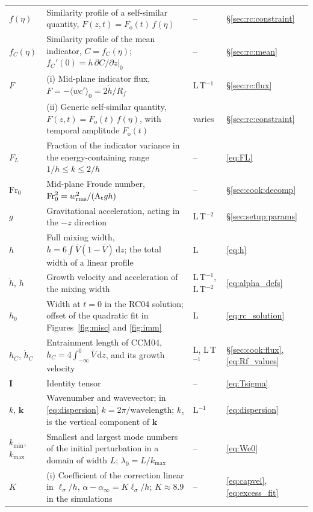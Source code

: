 \documentclass[11pt]{article}
\numberwithin{equation}{section}
\newcommand{\avg}[1]{\langle #1\rangle}
\newcommand{\At}{\mathrm{A_t}}
\newcommand{\ls}{\ell_\sigma}
\newcommand{\hd}{\dot h}
\begin{document}
\begin{longtable}{@{}P{0.13}P{0.53}P{0.13}P{0.13}@{}}
$f(\eta)$ & Similarity profile of a self-similar quantity, $F(z, t) = F_\mathrm{o}(t) \, f(\eta)$ & -- & \S\ref{sec:rc:constraint}\\
$f_C(\eta)$ & Similarity profile of the mean indicator, $C = f_C(\eta)$; $f_C'(0) = h \, \partial C/\partial z |_0$ & -- & \S\ref{sec:rc:mean}\\
$F$ & (i) Mid-plane indicator flux, $F = -\avg{w c'}_0 = 2 \hd/R_f$ & L\,T$^{-1}$ & \S\ref{sec:rc:flux}\\
 & (ii) Generic self-similar quantity, $F(z, t) = F_\mathrm{o}(t) \, f(\eta)$, with temporal amplitude $F_\mathrm{o}(t)$ & varies & \S\ref{sec:rc:constraint}\\
$F_L$ & Fraction of the indicator variance in the energy-containing range $1/h \le k \le 2/h$ & -- & \eqref{eq:FL}\\
$\mathrm{Fr}_0$ & Mid-plane Froude number, $\mathrm{Fr}_0^2 = w_{\rm rms}^2/(\At g h)$ & -- & \S\ref{sec:cook:decomp}\\
$g$ & Gravitational acceleration, acting in the $-z$ direction & L\,T$^{-2}$ & \S\ref{sec:setup:params}\\
$h$ & Full mixing width, $h = 6 \int \bar V(1 - \bar V) \, \mathrm d z$; the total width of a linear profile & L & \eqref{eq:h}\\
$\hd$, $\ddot h$ & Growth velocity and acceleration of the mixing width & L\,T$^{-1}$, L\,T$^{-2}$ & \eqref{eq:alpha_defs}\\
$h_0$ & Width at $t = 0$ in the RC04 solution; offset of the quadratic fit in Figures~\ref{fig:misc} and \ref{fig:imm} & L & \eqref{eq:rc_solution}\\
$h_C$, $\hd_C$ & Entrainment length of CCM04, $h_C = 4 \int_{-\infty}^0 \bar V \, \mathrm d z$, and its growth velocity & L, L\,T$^{-1}$ & \S\ref{sec:cook:flux}, \eqref{eq:Rf_values}\\
$\mathbf I$ & Identity tensor & -- & \eqref{eq:Tsigma}\\
$k$, $\mathbf k$ & Wavenumber and wavevector; in \eqref{eq:dispersion} $k = 2 \pi/\text{wavelength}$; $k_z$ is the vertical component of $\mathbf k$ & L$^{-1}$ & \eqref{eq:dispersion}\\
$k_{\min}$, $k_{\max}$ & Smallest and largest mode numbers of the initial perturbation in a domain of width $L$; $\lambda_0 = L/k_{\max}$ & -- & \eqref{eq:We0}\\
$K$ & (i) Coefficient of the correction linear in $\ls/h$, $\alpha - \alpha_\infty = K \ls/h$; $K \approx 8.9$ in the simulations & -- & \eqref{eq:capvel}, \eqref{eq:excess_fit}\\

\end{longtable}
\end{document}
